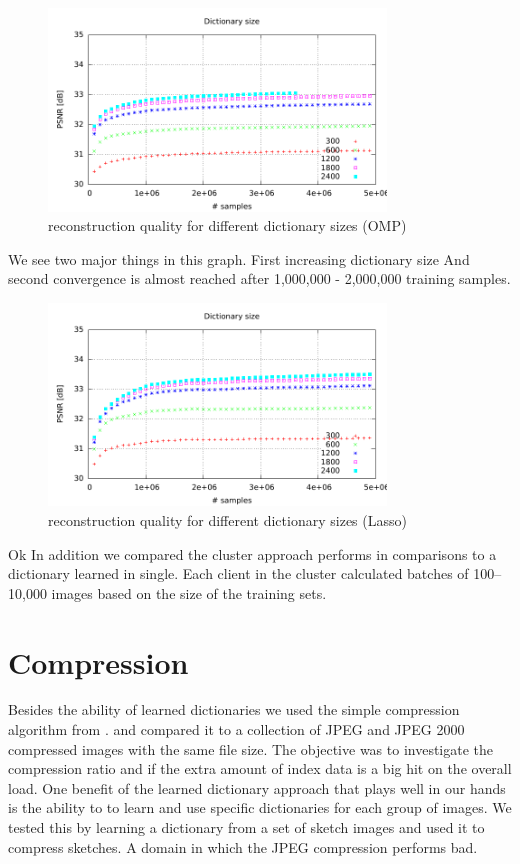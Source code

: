\begin{figure}[h]
\centering
\includegraphics[width = 0.8\textwidth]{../tests/results/old/dictSizeOMP.pdf}
\caption{reconstruction quality for different dictionary sizes (OMP)}
\label{fig:dictSizeOMP}
\end{figure}

We see two major things in this graph. First increasing dictionary size 
And second convergence is almost reached after 1,000,000 - 2,000,000 training
samples. 

\begin{figure}[h]
\centering
\includegraphics[width = 0.8\textwidth]{../tests/results/old/dictSizeLasso.pdf}
\caption{reconstruction quality for different dictionary sizes (Lasso)}
\label{fig:dict size}
\end{figure}

Ok 
In addition we compared the cluster approach performs in
comparisons to a dictionary learned in single. Each client in the cluster
calculated batches of 100--10,000 images based on the
size of the training sets.



\newpage
\section{Compression}
Besides the ability of learned dictionaries 
we used the simple compression algorithm from  .
and compared it to a collection of JPEG and JPEG 2000 compressed images with the
same file size. The objective was to investigate the compression ratio and if
the extra amount of index data is a big hit on the overall load.
One benefit of the learned dictionary approach that plays well in our
hands is the ability to to learn and use specific dictionaries for each group of
images. We tested this by learning a dictionary from a set of sketch images and
used it to compress sketches. A domain in which the JPEG compression performs
bad.


